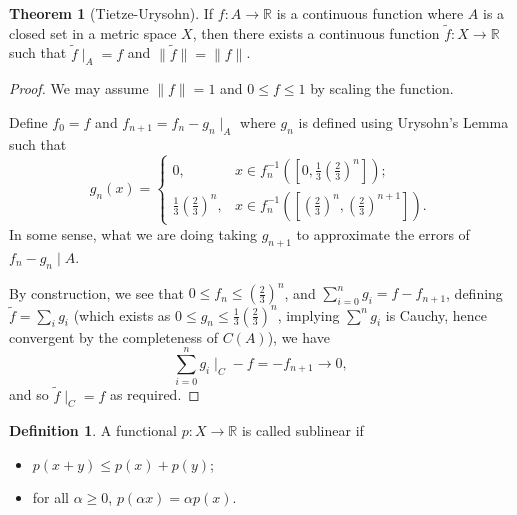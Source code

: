 \documentclass[]{article}
\theoremstyle{definition}
\newtheorem{theorem}{Theorem}
\theoremstyle{definition}
\newtheorem{definition}{Definition}[section]
\begin{document}
\begin{theorem}[Tietze-Urysohn]
  If \(f : A \to \mathbb{R}\) is a continuous function where \(A\) is a 
  closed set in a metric space \(X\), then there exists a continuous function 
  \(\tilde f : X \to \mathbb{R}\) such that \(\tilde f\mid_A = f\) and 
  \(\|\tilde f\| = \|f\|\). 
\end{theorem}
\begin{proof}
  We may assume \(\|f\| = 1\) and \(0 \le f \le 1\) by scaling the function. 

  Define \(f_0 = f\) and \(f_{n + 1} = f_n - g_n\mid_A\) where \(g_n\) is defined 
  using Urysohn's Lemma such that 
  \[g_n(x) = \begin{cases}
    0, & x \in f_n^{-1}([0, \frac{1}{3}(\frac{2}{3})^n]);\\
    \frac{1}{3}\left(\frac{2}{3}\right)^n, & x \in 
      f_n^{-1}([(\frac{2}{3})^n, (\frac{2}{3})^{n + 1}]).
  \end{cases}\]
  In some sense, what we are doing taking \(g_{n + 1}\) to approximate 
  the errors of \(f_n - g_n\mid A\). 
  
  By construction, we see that \(0 \le f_n \le (\frac{2}{3})^n\), and 
  \(\sum^n_{i = 0} g_i = f - f_{n + 1}\), defining \(\tilde f = \sum_i g_i\) 
  (which exists as \(0 \le g_n \le \frac{1}{3}(\frac{2}{3})^n\), implying 
  \(\sum^n g_i\) is Cauchy, hence convergent by the completeness of \(C(A)\)), 
  we have 
  \[\sum_{i = 0}^n g_i\mid_C - f = - f_{n + 1} \to 0,\]
  and so \(\tilde f\mid_C = f\) as required.
\end{proof}

\begin{definition}
  A functional \(p : X \to \mathbb{R}\) is called sublinear if 
  \begin{itemize}
    \item \(p(x + y) \le p(x) + p(y)\);
    \item for all \(\alpha \ge 0\), \(p(\alpha x) = \alpha p(x)\).
  \end{itemize}
\end{definition}
\end{document}
